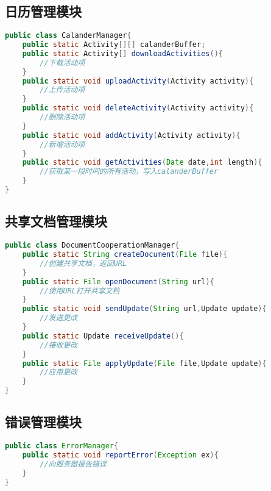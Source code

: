\subsection{日历管理模块}
\begin{lstlisting}[language=Java, caption=日历管理模块接口]
public class CalanderManager{
    public static Activity[][] calanderBuffer;
    public static Activity[] downloadActivities(){
        //下载活动项
    }
    public static void uploadActivity(Activity activity){
        //上传活动项
    }
    public static void deleteActivity(Activity activity){
        //删除活动项
    }
    public static void addActivity(Activity activity){
        //新增活动项
    }
    public static void getActivities(Date date,int length){
        //获取某一段时间的所有活动，写入calanderBuffer
    }
}
\end{lstlisting}

\subsection{共享文档管理模块}
\begin{lstlisting}[language=Java, caption=共享文档管理模块接口]
public class DocumentCooperationManager{
    public static String createDocument(File file){
        //创建共享文档，返回URL
    }
    public static File openDocument(String url){
        //使用URL打开共享文档
    }
    public static void sendUpdate(String url,Update update){
        //发送更改
    }
    public static Update receiveUpdate(){
        //接收更改
    }
    public static File applyUpdate(File file,Update update){
        //应用更改
    }
}
\end{lstlisting}

\subsection{错误管理模块}
\begin{lstlisting}[language=Java, caption=错误管理模块接口]
public class ErrorManager{
    public static void reportError(Exception ex){
        //向服务器报告错误
    }
}
\end{lstlisting}
